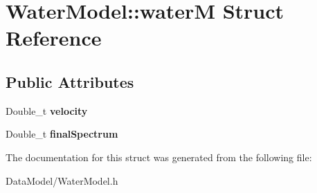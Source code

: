 \hypertarget{structWaterModel_1_1waterM}{\section{Water\-Model\-:\-:water\-M Struct Reference}
\label{structWaterModel_1_1waterM}
}
\subsection*{Public Attributes}
\begin{DoxyCompactItemize}
\item 
\hypertarget{structWaterModel_1_1waterM_a25888dbf4985077f63b1219f5b0b5037}{Double\-\_\-t {\bfseries velocity}}\label{structWaterModel_1_1waterM_a25888dbf4985077f63b1219f5b0b5037}

\item 
\hypertarget{structWaterModel_1_1waterM_a3983d2bfa5887f8abbedc7e6be12be57}{Double\-\_\-t {\bfseries final\-Spectrum}}\label{structWaterModel_1_1waterM_a3983d2bfa5887f8abbedc7e6be12be57}

\end{DoxyCompactItemize}


The documentation for this struct was generated from the following file\-:\begin{DoxyCompactItemize}
\item 
Data\-Model/Water\-Model.\-h\end{DoxyCompactItemize}
